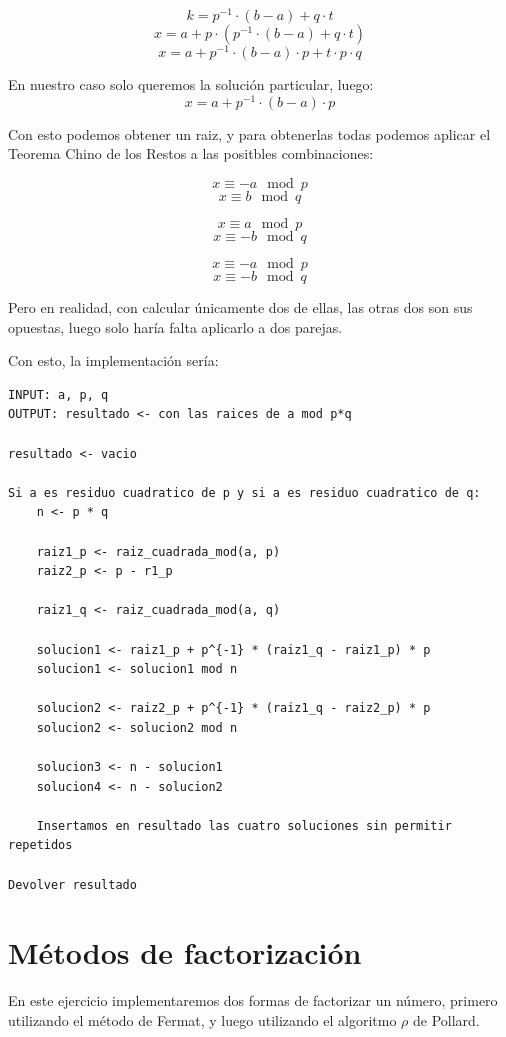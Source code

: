 \documentclass[12pt, spanish]{article}
\begin{document}
$$k = p^{-1} \cdot (b - a) + q \cdot t$$
$$x = a + p \cdot (p^{-1} \cdot (b - a) + q \cdot t )$$
$$x = a + p^{-1} \cdot (b - a) \cdot p + t \cdot p \cdot q$$

En nuestro caso solo queremos la solución particular, luego:
$$x = a + p^{-1} \cdot (b - a) \cdot p$$

Con esto podemos obtener un raiz, y para obtenerlas todas podemos aplicar el Teorema Chino de los Restos a las positbles combinaciones:

$$x \equiv -a \mod p$$
$$x \equiv b \mod q$$

$$x \equiv a \mod p$$
$$x \equiv -b \mod q$$


$$x \equiv -a \mod p$$
$$x \equiv -b \mod q$$

Pero en realidad, con calcular únicamente dos de ellas, las otras dos son sus opuestas, luego solo haría falta aplicarlo a dos parejas.

Con esto, la implementación sería:


\begin{lstlisting}[caption={Algoritmo raices cuadradas mod p*q}]
INPUT: a, p, q
OUTPUT: resultado <- con las raices de a mod p*q

resultado <- vacio

Si a es residuo cuadratico de p y si a es residuo cuadratico de q:
	n <- p * q

	raiz1_p <- raiz_cuadrada_mod(a, p)
	raiz2_p <- p - r1_p

	raiz1_q <- raiz_cuadrada_mod(a, q)

	solucion1 <- raiz1_p + p^{-1} * (raiz1_q - raiz1_p) * p
	solucion1 <- solucion1 mod n

	solucion2 <- raiz2_p + p^{-1} * (raiz1_q - raiz2_p) * p
	solucion2 <- solucion2 mod n

	solucion3 <- n - solucion1
	solucion4 <- n - solucion2

	Insertamos en resultado las cuatro soluciones sin permitir repetidos

Devolver resultado
\end{lstlisting}


\section{Métodos de factorización}

En este ejercicio implementaremos dos formas de factorizar un número, primero utilizando el método de Fermat, y luego utilizando el algoritmo $\rho$ de Pollard.
\end{document}
